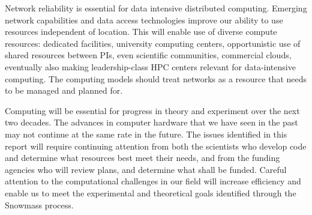 Network reliability is essential for data intensive distributed computing.
Emerging network capabilities and data access technologies improve our
ability to use resources independent of location. This will enable use of
diverse compute resources: dedicated facilities, university computing
centers, opportunistic use of shared resources between PIs, even scientific
communities, commercial clouds, eventually also making leadership-class HPC
centers relevant for data-intensive computing. The computing models should
treat networks as a resource that needs to be managed and planned for.

Computing will be essential for progress in theory and experiment over the
next two decades. 
The advances in computer hardware that we have seen
in the past may not continue at the same rate in the future. The issues
identified in this report will require continuing attention from both the
scientists who develop code and determine what resources best meet
their needs, and from the funding agencies who will review plans, and
determine what shall be funded.
Careful attention to the computational challenges in our field
will increase efficiency and enable us to meet the
experimental and theoretical goals identified through the Snowmass process.
